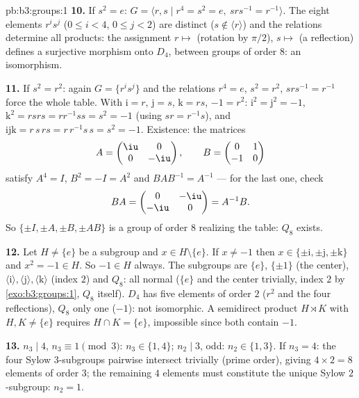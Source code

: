 \begin{solution}{pb:b3:groups:1}
\textbf{10.} If $s^2 = e$: $G = \langle r, s \mid r^4 = s^2 = e,\
srs^{-1} = r^{-1}\rangle$. The eight elements $r^is^j$ ($0 \leq i
< 4$, $0 \leq j < 2$) are distinct ($s \notin \langle r\rangle$)
and the relations determine all products: the assignment $r
\mapsto$ (rotation by $\pi/2$), $s \mapsto$ (a reflection) defines
a surjective morphism onto $D_4$, between groups of order $8$: an
isomorphism.

\textbf{11.} If $s^2 = r^2$: again $G = \{r^i s^j\}$ and the
relations $r^4 = e$, $s^2 = r^2$, $srs^{-1} = r^{-1}$ force the
whole table. With $\mathrm i = r$, $\mathrm j = s$, $\mathrm k =
rs$, $-1 = r^2$: $\mathrm i^2 = \mathrm j^2 = -1$, $\mathrm k^2 =
rsrs = r r^{-1} s s = s^2 = -1$ (using $sr = r^{-1}s$), and
$\mathrm i \mathrm j \mathrm k = r\,s\,rs = r\,r^{-1}s\,s = s^2 =
-1$. Existence: the matrices
\[
A = \begin{pmatrix} \iu & 0\\ 0 & -\iu \end{pmatrix},
\qquad
B = \begin{pmatrix} 0 & 1\\ -1 & 0 \end{pmatrix}
\]
satisfy $A^4 = I$, $B^2 = -I = A^2$ and $BAB^{-1} = A^{-1}$ ---
for the last one, check
\[
BA = \begin{pmatrix} 0 & -\iu\\ -\iu & 0 \end{pmatrix} = A^{-1}B .
\]
So $\{\pm I, \pm A, \pm B, \pm AB\}$ is a group of order $8$
realizing the table: $Q_8$ exists.

\textbf{12.} Let $H \neq \{e\}$ be a subgroup and $x \in H
\setminus \{e\}$. If $x \neq -1$ then $x \in \{\pm\mathrm i,
\pm\mathrm j, \pm\mathrm k\}$ and $x^2 = -1 \in H$. So $-1 \in H$
always. The subgroups are $\{e\}$, $\{\pm 1\}$ (the center),
$\langle \mathrm i\rangle, \langle \mathrm j\rangle, \langle
\mathrm k\rangle$ (index $2$) and $Q_8$: all normal ($\{e\}$ and
the center trivially, index $2$ by \cref{exo:b3:groups:1}, $Q_8$
itself). $D_4$ has five elements of order $2$ ($r^2$ and the four
reflections), $Q_8$ only one ($-1$): not isomorphic. A semidirect
product $H \rtimes K$ with $H, K \neq \{e\}$ requires $H \cap K =
\{e\}$, impossible since both contain $-1$.

\textbf{13.} $n_3 \mid 4$, $n_3 \equiv 1 \pmod 3$: $n_3 \in \{1,
4\}$; $n_2 \mid 3$, odd: $n_2 \in \{1, 3\}$. If $n_3 = 4$: the
four Sylow $3$-subgroups pairwise intersect trivially (prime
order), giving $4 \times 2 = 8$ elements of order $3$; the
remaining $4$ elements must constitute the unique Sylow
$2$-subgroup: $n_2 = 1$.


\end{solution}
